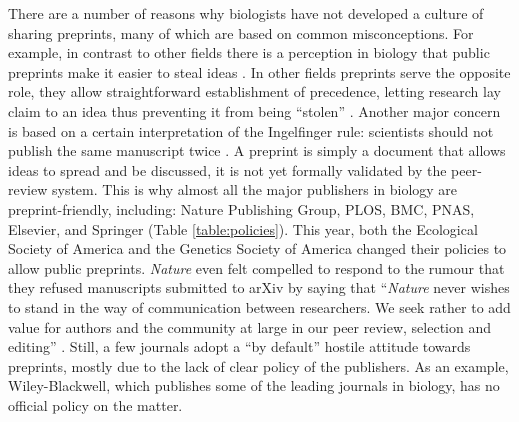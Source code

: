 \documentclass[letterpaper]{article}
\begin{document}
There are a number of reasons why biologists have not developed a culture of
sharing preprints, many of which are based on common misconceptions. For
example, in contrast to other fields there is a perception in biology that
public preprints make it easier to steal ideas \cite{gin11}. In other fields
preprints serve the opposite role, they allow straightforward establishment
of precedence, letting research lay claim to an idea thus preventing it from
being ``stolen'' \cite{gin11}. Another major concern is based on a certain
interpretation of the Ingelfinger rule: scientists should not publish the
same manuscript twice \cite{alt96}. A preprint is simply a document that
allows ideas to spread and be discussed, it is not yet formally validated by
the peer-review system. This is why almost all the major publishers in
biology are preprint-friendly, including: Nature Publishing Group, PLOS,
BMC, PNAS, Elsevier, and Springer (Table \ref{table:policies}). This year, both the Ecological
Society of America and the Genetics Society of America changed their
policies to allow public preprints. \emph{Nature} even felt compelled to
respond to the rumour that they refused manuscripts submitted to arXiv by
saying that ``\emph{Nature} never wishes to stand in the way of
communication between researchers. We seek rather to add value for authors
and the community at large in our peer review, selection and editing'' \cite
{nat05}. Still, a few journals adopt a ``by default'' hostile attitude
towards preprints, mostly due to the lack of clear policy of the publishers.
As an example, Wiley-Blackwell, which publishes some of the leading journals
in biology, has no official policy on the matter.
\end{document}
